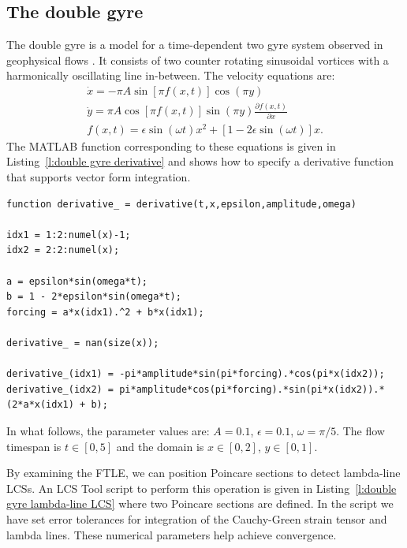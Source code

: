 \documentclass{article}
\begin{document}
\subsection{The double gyre}
The double gyre is a model for a time-dependent two gyre system observed in geophysical flows \parencite{shadden05:_defin_lagran_lyapun}. It consists of two counter rotating sinusoidal vortices with a harmonically oscillating line in-between. The velocity equations are:
\begin{equation}
\begin{split}
\dot x = -\pi A \sin[\pi f(x,t)] \cos(\pi y)\\
\dot y = \pi A \cos[\pi f(x,t)] \sin(\pi y) \frac{\partial f(x,t)}{\partial x}\\
f(x,t) = \epsilon \sin(\omega t) x^2 + [1 - 2 \epsilon \sin(\omega t)] x.
\end{split}
\label{eq:double gyre derivative equations}
\end{equation}
The MATLAB function corresponding to these equations is given in Listing~\ref{l:double gyre derivative} and shows how to specify a derivative function that supports vector form integration.

\begin{lstlisting}[caption={Double gyre derivative function corresponding to Equations~\eqref{eq:double gyre derivative equations}.},label=l:double gyre derivative]
function derivative_ = derivative(t,x,epsilon,amplitude,omega)

idx1 = 1:2:numel(x)-1;
idx2 = 2:2:numel(x);

a = epsilon*sin(omega*t);
b = 1 - 2*epsilon*sin(omega*t);
forcing = a*x(idx1).^2 + b*x(idx1);

derivative_ = nan(size(x));

derivative_(idx1) = -pi*amplitude*sin(pi*forcing).*cos(pi*x(idx2));
derivative_(idx2) = pi*amplitude*cos(pi*forcing).*sin(pi*x(idx2)).*(2*a*x(idx1) + b);
\end{lstlisting}

In what follows, the parameter values are: $A = 0.1$, $\epsilon = 0.1$, $\omega = \pi/5$. The flow timespan is $t \in [0,5]$ and the domain is $x \in [0,2]$, $y \in [0,1]$.

By examining the FTLE, we can position Poincare sections to detect lambda-line LCSs. An LCS Tool script to perform this operation is given in Listing~\ref{l:double gyre lambda-line LCS} where two Poincare sections are defined. In the script we have set error tolerances for integration of the Cauchy-Green strain tensor and lambda lines. These numerical parameters help achieve convergence.
\end{document}

